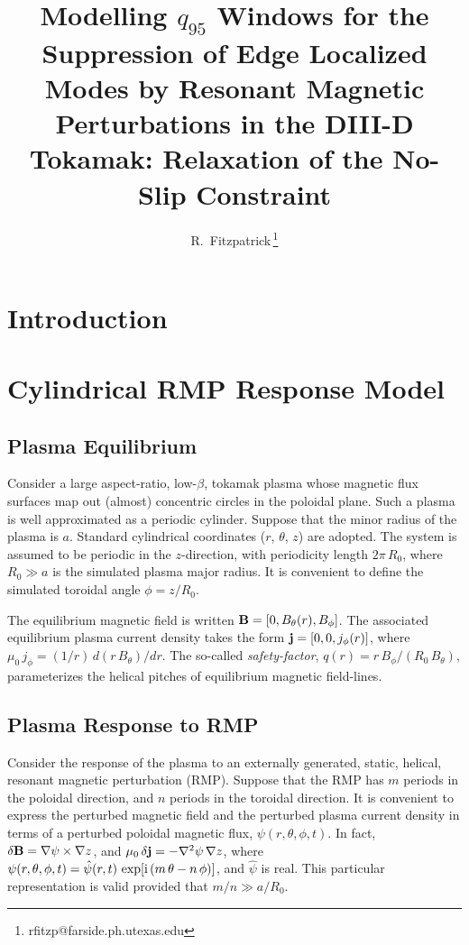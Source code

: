 \documentclass[12pt,prb,aps]{revtex4-1}
\begin{document}
\title {Modelling $q_{95}$ Windows for the Suppression of Edge Localized Modes by Resonant Magnetic Perturbations in the DIII-D Tokamak: Relaxation of the No-Slip
Constraint}

\author{R.~Fitzpatrick\,\footnote{rfitzp@farside.ph.utexas.edu}}


\section{Introduction}

\section{Cylindrical RMP Response Model}\label{s2}
\subsection{Plasma Equilibrium}
Consider a large aspect-ratio, low-$\beta$, tokamak plasma whose magnetic flux surfaces map out (almost)
concentric circles in the poloidal plane.
Such a plasma is well approximated as a periodic cylinder.  Suppose that the minor radius of the plasma
is $a$. Standard cylindrical coordinates ($r$, $\theta$, $z$) are adopted. The system is assumed to
be periodic in the $z$-direction, with periodicity length $2\pi\,R_0$, where $R_0\gg a$ is the simulated
plasma major radius. It is convenient to define the simulated toroidal angle $\phi=z/R_0$. 

The equilibrium magnetic field is written ${\bf B} = [0,B_\theta(r), B_\phi]$. The associated equilibrium
plasma current density takes the form ${\bf j} =[0,0,j_\phi(r)]$, where $\mu_0\,j_\phi= (1/r)\,d(r\,B_\theta)/dr$. The
so-called {\em safety-factor}, $q(r)=r\,B_\phi/(R_0\,B_\theta)$, parameterizes the helical pitches of equilibrium magnetic
field-lines. 

\subsection{Plasma Response to RMP}
Consider the response of the plasma to an externally generated, static, helical, resonant magnetic perturbation (RMP). 
Suppose that the RMP has $m$ periods in the poloidal direction, and $n$ periods in the toroidal direction.
It is convenient to express the perturbed magnetic field and the perturbed plasma current density in
terms of a perturbed poloidal magnetic flux, $\psi(r,\theta,\phi,t)$. In fact, $\delta{\bf B} = \nabla\psi\times \nabla z$, 
and $\mu_0\,\delta {\bf j} = - \nabla^2\psi\,\nabla z$,
where $\psi(r,\theta,\phi,t) = \hat{\psi}(r,t)\,\exp[{\rm i}\,(m\,\theta-n\,\phi)]$, and $\hat{\psi}$ is real. This particular representation
is valid provided that $m/n\gg a/R_0$.\cite{rfa}
\end{document}
